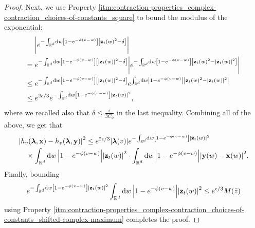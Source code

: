 \documentclass[11pt]{article}
\newcommand{\R}{\mathbb R}
\newcommand{\bl}{\bm{\lambda}}
\newcommand{\bx}{\vb{x}}
\newcommand{\by}{\vb{y}}
\newcommand{\bz}{\vb{z}}
\newcommand{\tz}{\tilde{z}}
\numberwithin{equation}{section}
\theoremstyle{plain}
\theoremstyle{definition}
\theoremstyle{remark}
\begin{document}
\begin{proof}
Next, we use Property \ref{itm:contraction-properties_complex-contraction_choices-of-constants_square} to bound the modulus of the exponential:
\begin{equation}
\begin{split}
{}&\abs{e^{-\int_{\R^{d}}\dd{w}\left[1-e^{-\phi(v-w)}\right]\left[\bz_{t}(w)^{2}-\delta\right]}} \\
={}&e^{-\int_{\R^{d}}\dd{w}\left[1-e^{-\phi(v-w)}\right]\left[\abs{\bz_{t}(w)}^{2}-\delta\right]}
\abs{e^{-\int_{\R^{d}}\dd{w}\left[1-e^{-\phi(v-w)}\right]\left[\bz_{t}(w)^{2}-\abs{\bz_{t}(w)}^{2}\right]}} \\
\le{}&e^{-\int_{\R^{d}}\dd{w}\left[1-e^{-\phi(v-w)}\right]\left[\abs{\bz_{t}(w)}^{2}-\delta\right]}
e^{\int_{\R^{d}}\dd{w}\abs{1-e^{-\phi(v-w)}}\abs{\bz_{t}(w)^{2}-\abs{\bz_{t}(w)}^{2}}} \\
\le{}& e^{2\epsilon/3} e^{-\int_{\R^{d}}\dd{w}\left[1-e^{-\phi(v-w)}\right]\abs{\bz_{t}(w)}^{2}},
\end{split}
\end{equation}
where we recalled also that $\delta\le\frac{\epsilon}{3C_{\phi}}$ in the last inequality.
Combining all of the above, we get that
\begin{equation}
\begin{multlined}
\abs{h_{v}(\bl,\bx)-h_{v}(\bl,\by)}^{2}
\le e^{2\epsilon/3}\abs{\bl(v)}
e^{-\int_{\R^{d}}\dd{w}\left[1-e^{-\phi(v-w)}\right]\abs{\bz_{t}(w)}^{2}}
\\
\times
\int_{\R^{d}}\dd{w}\abs{1-e^{-\phi(v-w)}}\abs{\bz_{t}(w)}^{2}
\cdot\int_{\R^{d}}\dd{w}\abs{1-e^{-\phi(v-w)}}\abs{\by(w)-\bx(w)}^{2}.
\end{multlined}
\end{equation}
Finally, bounding
\begin{equation}
e^{-\int_{\R^{d}}\dd{w}\left[1-e^{-\phi(v-w)}\right]\abs{\bz_{t}(w)}^{2}}
\int_{\R^{d}}\dd{w}\abs{1-e^{-\phi(v-w)}}\abs{\bz_{t}(w)}^{2}
\le e^{\epsilon/3}M(\tz)
\end{equation}
using Property \ref{itm:contraction-properties_complex-contraction_choices-of-constants_shifted-complex-maximum} completes the proof.
\end{proof}
\end{document}
